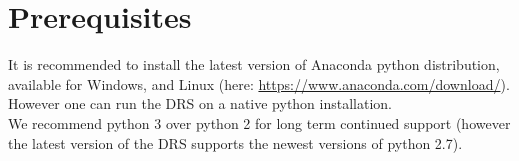 \clearpage
\newpage
\section{Prerequisites}
\label{ch:install:prerequisites}

It is recommended to install the latest version of Anaconda python distribution, available for Windows, \mac and Linux (here: \url{https://www.anaconda.com/download/}). However one can run the DRS on a native python installation. \\

\noindent We recommend python 3 over python 2 for long term continued support (however the latest version of the DRS supports the newest versions of python 2.7). \\

 \\

